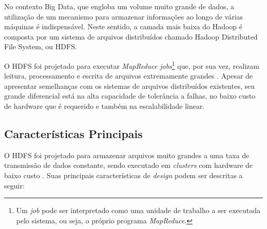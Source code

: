 No contexto Big Data, que engloba um volume muito grande de dados, a utilização de um mecanismo para armazenar informações ao longo de várias máquinas é indispensável. Neste sentido, a camada mais baixa do Hadoop é composta por um sistema de arquivos distribuídos chamado Hadoop Distributed File System, ou HDFS.

O HDFS foi projetado para executar \textit{MapReduce} \textit{jobs}\footnote{Um \textit{job} pode ser interpretado como uma unidade de trabalho a ser executada pelo sistema, ou seja, o próprio programa \textit{MapReduce}.} que, por sua vez, realizam leitura, processamento e escrita de arquivos extremamente grandes \cite{venner2009}. Apesar de apresentar semelhanças com os sistemas de arquivos distribuídos existentes, seu grande diferencial está na alta capacidade de tolerância a falhas, no baixo custo de hardware que é requerido e também na escalabilidade linear.

\subsection{Características Principais}

O HDFS foi projetado para armazenar arquivos muito grandes a uma taxa de transmissão de dados constante, sendo executado em \textit{clusters} com hardware de baixo custo \cite{white2012}. Suas principais características de \textit{design} podem ser descritas a seguir:


